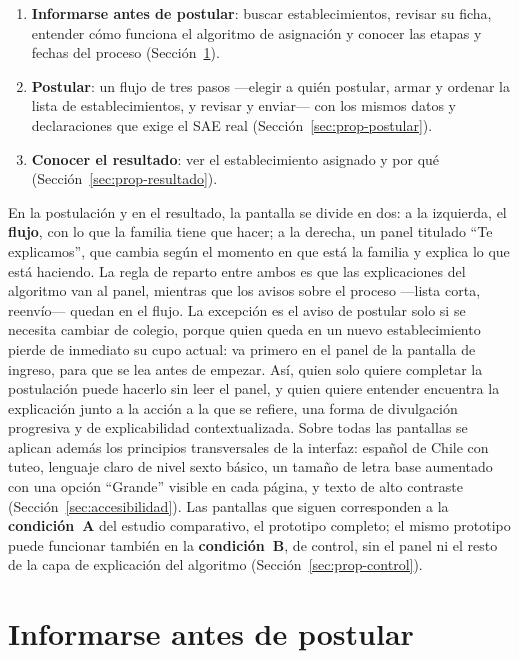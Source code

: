 \begin{enumerate}
    \item \textbf{Informarse antes de postular}: buscar establecimientos, revisar su ficha, entender cómo funciona el algoritmo de asignación y conocer las etapas y fechas del proceso (Sección~\ref{sec:prop-informarse}).
    \item \textbf{Postular}: un flujo de tres pasos ---elegir a quién postular, armar y ordenar la lista de establecimientos, y revisar y enviar--- con los mismos datos y declaraciones que exige el SAE real (Sección~\ref{sec:prop-postular}).
    \item \textbf{Conocer el resultado}: ver el establecimiento asignado y por qué (Sección~\ref{sec:prop-resultado}).
\end{enumerate}

En la postulación y en el resultado, la pantalla se divide en dos: a la izquierda, el \textbf{flujo}, con lo que la familia tiene que hacer; a la derecha, un panel titulado ``Te explicamos'', que cambia según el momento en que está la familia y explica lo que está haciendo. La regla de reparto entre ambos es que las explicaciones del algoritmo van al panel, mientras que los avisos sobre el proceso ---lista corta, reenvío--- quedan en el flujo. La excepción es el aviso de postular solo si se necesita cambiar de colegio, porque quien queda en un nuevo establecimiento pierde de inmediato su cupo actual: va primero en el panel de la pantalla de ingreso, para que se lea antes de empezar. Así, quien solo quiere completar la postulación puede hacerlo sin leer el panel, y quien quiere entender encuentra la explicación junto a la acción a la que se refiere, una forma de divulgación progresiva y de explicabilidad contextualizada. Sobre todas las pantallas se aplican además los principios transversales de la interfaz: español de Chile con tuteo, lenguaje claro de nivel sexto básico, un tamaño de letra base aumentado con una opción ``Grande'' visible en cada página, y texto de alto contraste (Sección~\ref{sec:accesibilidad}). Las pantallas que siguen corresponden a la \textbf{condición~A} del estudio comparativo, el prototipo completo; el mismo prototipo puede funcionar también en la \textbf{condición~B}, de control, sin el panel ni el resto de la capa de explicación del algoritmo (Sección~\ref{sec:prop-control}).

\section{Informarse antes de postular}\label{sec:prop-informarse}

